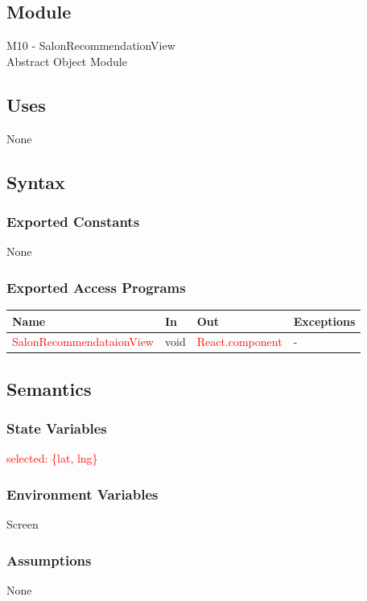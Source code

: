\documentclass[12pt, titlepage]{article}
\begin{document}
\subsection{Module}
M10 - SalonRecommendationView \\
Abstract Object Module

\subsection{Uses}
None

\subsection{Syntax}
\subsubsection{Exported Constants}
None

\subsubsection{Exported Access Programs}
\begin{center}
\begin{tabular}{p{6cm} p{3cm} p{4cm} p{3cm}}
\hline
\textbf{Name} & \textbf{In} & \textbf{Out} & \textbf{Exceptions} \\
\hline
\textcolor{red}{SalonRecommendataionView} & void & \textcolor{red}{React.component} &  -\\
\hline
\end{tabular}
\end{center}

\subsection{Semantics}

\subsubsection{State Variables}
\textcolor{red}{selected: \{lat, lng\}} 

\subsubsection{Environment Variables}
Screen 

\subsubsection{Assumptions}
None
\end{document}
